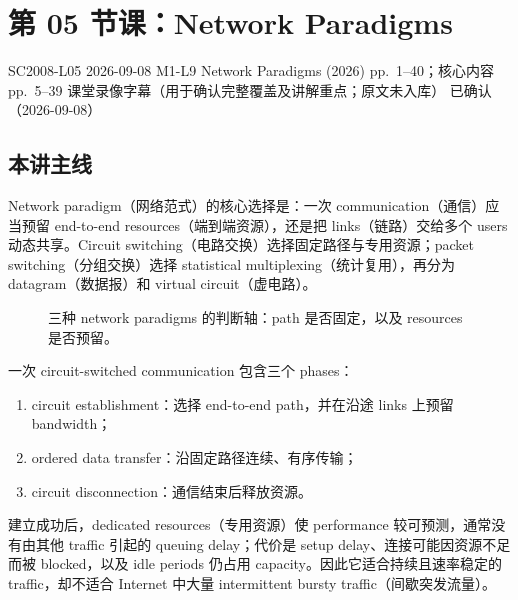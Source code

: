 
\section{第 05 节课：Network Paradigms}
\label{lecture:SC2008-L05}

\lecturemeta
  {SC2008-L05}
  {2026-09-08}
  {M1-L9 Network Paradigms (2026)}
  {pp.~1--40；核心内容 pp.~5--39}
  {课堂录像字幕（用于确认完整覆盖及讲解重点；原文未入库）}
  {已确认（2026-09-08）}

\subsection{本讲主线}

Network paradigm（网络范式）的核心选择是：一次 communication（通信）应当预留 end-to-end resources（端到端资源），还是把 links（链路）交给多个 users 动态共享。Circuit switching（电路交换）选择固定路径与专用资源；packet switching（分组交换）选择 statistical multiplexing（统计复用），再分为 datagram（数据报）和 virtual circuit（虚电路）。

\begin{figure}[htbp]
  \centering
  \resizebox{0.98\textwidth}{!}{}
  \caption{三种 network paradigms 的判断轴：path 是否固定，以及 resources 是否预留。}
  \label{fig:sc2008-l05-paradigms}
\end{figure}


一次 circuit-switched communication 包含三个 phases：
\begin{enumerate}[label=(\arabic*)]
  \item circuit establishment：选择 end-to-end path，并在沿途 links 上预留 bandwidth；
  \item ordered data transfer：沿固定路径连续、有序传输；
  \item circuit disconnection：通信结束后释放资源。
\end{enumerate}

建立成功后，dedicated resources（专用资源）使 performance 较可预测，通常没有由其他 traffic 引起的 queuing delay；代价是 setup delay、连接可能因资源不足而被 blocked，以及 idle periods 仍占用 capacity。因此它适合持续且速率稳定的 traffic，却不适合 Internet 中大量 intermittent bursty traffic（间歇突发流量）。

